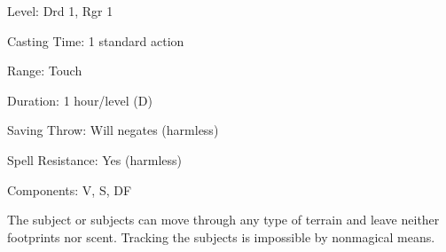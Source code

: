 
\begin{description*}
\item[Level:] Drd 1, Rgr 1
\item[Casting Time:] 1 standard action
\item[Range:] Touch
\item[Duration:] 1 hour/level (D)
\item[Saving Throw:] Will negates (harmless)
\item[Spell Resistance:] Yes (harmless)
\item[Components:] V, S, DF
\end{description*}

The subject or subjects can move through any type of terrain and leave neither
footprints nor scent. Tracking the subjects is impossible by nonmagical means.